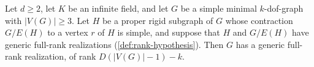 \begin{lemma}
  \label{lem:case-I-realization}
  \leanok
  Let $d \ge 2$, let $K$ be an infinite field, and let $G$ be a simple
  minimal $k$-dof-graph with $|V(G)| \ge 3$. Let $H$ be a proper rigid
  subgraph of $G$ whose contraction $G/E(H)$ to a vertex $r$ of $H$ is
  simple, and suppose that $H$ and $G/E(H)$ have generic full-rank
  realizations (\cref{def:rank-hypothesis}). Then $G$ has a generic
  full-rank realization, of rank $D(|V(G)| - 1) - k$.
\end{lemma}
